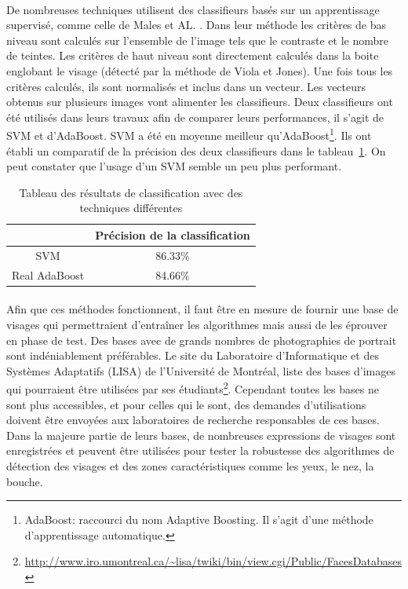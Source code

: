 \documentclass[11pt, french,screen]{report-rd-info}
\begin{document}
\paragraph*{}
De nombreuses techniques utilisent des classifieurs basés sur un apprentissage supervisé, comme celle de Males et AL. \cite{Males2013}. Dans leur méthode les critères de bas niveau sont calculés sur l’ensemble de l’image tels que le contraste et le nombre de teintes. Les critères de haut niveau sont directement calculés dans la boite englobant le visage (détecté par la méthode de Viola et Jones). Une fois tous les critères calculés, ils sont normalisés et inclus dans un vecteur. Les vecteurs obtenus sur plusieurs images vont alimenter les classifieurs. Deux classifieurs ont été utilisés dans leurs travaux afin de comparer leurs performances, il s’agit de SVM et d’AdaBoost. SVM a été en moyenne meilleur qu’AdaBoost\footnote{AdaBoost: raccourci du nom Adaptive Boosting. Il s'agit d'une méthode d'apprentissage automatique.}. Ils ont établi un comparatif de la précision des deux classifieurs dans le tableau~\ref{tab:ComparaisonSVMAdaBoost}. On peut constater que l'usage d'un SVM semble un peu plus performant.
\begin{table}
\begin{center}
\begin{tabular}{|c|c|}
\hline
& Précision de la classification \\
\hline
SVM & 86.33\% \\
\hline
Real AdaBoost & 84.66\% \\
\hline
\end{tabular}
\end{center}
\caption{Tableau des résultats de classification avec des techniques différentes \cite{Males2013}}
\label{tab:ComparaisonSVMAdaBoost}
\end{table}
\paragraph*{}
Afin que ces méthodes fonctionnent, il faut être en mesure de fournir une base de visages qui permettraient d'entraîner les algorithmes mais aussi de les éprouver en phase de test.
Des bases avec de grands nombres de photographies de portrait sont indéniablement préférables. Le site du Laboratoire d'Informatique et des Systèmes Adaptatifs (LISA) de l'Université de Montréal, liste des bases d'images qui pourraient être utilisées par ses étudiants\footnote{\url{http://www.iro.umontreal.ca/~lisa/twiki/bin/view.cgi/Public/FacesDatabases}}. Cependant toutes les bases ne sont plus accessibles, et pour celles qui le sont, des demandes d'utilisations doivent être envoyées aux laboratoires de recherche responsables de ces bases. Dans la majeure partie de leurs bases, de nombreuses expressions de visages sont enregistrées et peuvent être utilisées pour tester la robustesse des algorithmes de détection des visages et des zones caractéristiques comme les yeux, le nez, la bouche.
\end{document}
